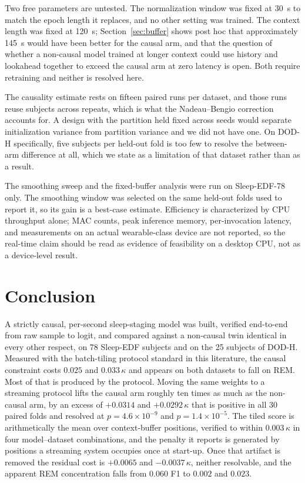 \documentclass[conference]{IEEEtran}
\begin{document}
Two free parameters are untested. The normalization window was fixed at 30~s to match the epoch
length it replaces, and no other setting was trained. The context length was fixed at 120~s;
Section~\ref{sec:buffer} shows post hoc that approximately 145~s would have been better for the
causal arm, and that the question of whether a non-causal model trained at longer context could use
history and lookahead together to exceed the causal arm at zero latency is open. Both require
retraining and neither is resolved here.

The causality estimate rests on fifteen paired runs per dataset, and those runs reuse subjects across
repeats, which is what the Nadeau--Bengio correction accounts for. A design with the partition held
fixed across seeds would separate initialization variance from partition variance and we did not have
one. On DOD-H specifically, five subjects per held-out fold is too few to resolve the between-arm
difference at all, which we state as a limitation of that dataset rather than as a result.

The smoothing sweep and the fixed-buffer analysis were run on Sleep-EDF-78 only. The smoothing window
was selected on the same held-out folds used to report it, so its gain is a best-case estimate.
Efficiency is characterized by CPU throughput alone; MAC counts, peak inference memory,
per-invocation latency, and measurements on an actual wearable-class device are not reported, so the
real-time claim should be read as evidence of feasibility on a desktop CPU, not as a device-level
result.

\section{Conclusion}

A strictly causal, per-second sleep-staging model was built, verified end-to-end from raw sample to
logit, and compared against a non-causal twin identical in every other respect, on 78 Sleep-EDF
subjects and on the 25 subjects of DOD-H. Measured with the batch-tiling protocol standard in this
literature, the causal constraint costs $0.025$ and $0.033\,\kappa$ and appears on both datasets to
fall on REM. Most of that is produced by the protocol. Moving the same weights to a streaming
protocol lifts the causal arm roughly ten times as much as the non-causal arm, by an excess of
$+0.0314$ and $+0.0292\,\kappa$ that is positive in all 30 paired folds and resolved at
$p = 4.6\times10^{-9}$ and $p = 1.4\times10^{-5}$. The tiled score is arithmetically the mean over
context-buffer positions, verified to within $0.003\,\kappa$ in four model--dataset combinations, and
the penalty it reports is generated by positions a streaming system occupies once at start-up. Once
that artifact is removed the residual cost is $+0.0065$ and $-0.0037\,\kappa$, neither resolvable,
and the apparent REM concentration falls from $0.060$ F1 to $0.002$ and $0.023$.
\end{document}
